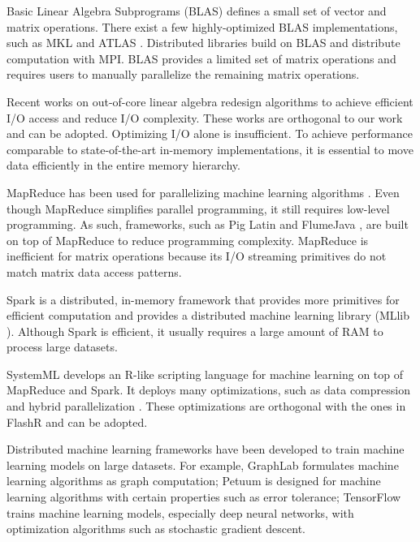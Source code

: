 Basic Linear Algebra Subprograms (BLAS) defines a small set of vector and
matrix operations. There exist a few highly-optimized BLAS implementations,
such as MKL \cite{mkl} and ATLAS \cite{atlas}. 
Distributed libraries \cite{trilinos, petsc, elemental}
build on BLAS and distribute computation with MPI.
BLAS provides a limited set of matrix operations and requires
users to manually parallelize the remaining matrix operations.

Recent works on out-of-core linear algebra \cite{Toledo99, Quintana-Orti12}
redesign algorithms to achieve efficient I/O access and reduce I/O
complexity. These works are orthogonal to our work and can be adopted.
Optimizing I/O
alone is insufficient. To achieve performance comparable to state-of-the-art
in-memory implementations, it is essential to move data efficiently in
the entire memory hierarchy.

MapReduce \cite{mapreduce} has been used for parallelizing machine learning
algorithms \cite{Chu06}. Even though MapReduce simplifies parallel programming,
it still requires low-level programming. As such, frameworks, such as Pig Latin
\cite{pig} and FlumeJava \cite{flumejava}, are built on top
of MapReduce to reduce programming complexity. MapReduce is inefficient for
matrix operations because
its I/O streaming primitives do not match matrix data access patterns.

Spark \cite{spark} is a distributed, in-memory framework that provides more
primitives for efficient computation and provides a distributed machine
learning library (MLlib \cite{mllib}). Although Spark is efficient, it usually
requires a large amount of RAM to process large datasets.

SystemML \cite{systemml, systemml2} develops an R-like scripting language for
machine learning on top of MapReduce and Spark. It deploys many optimizations,
such as data compression \cite{Elgohary16} and hybrid parallelization
\cite{Boehm14}. These optimizations are orthogonal with the ones in FlashR
and can be adopted.

Distributed machine learning frameworks have been developed to train machine
learning models on large datasets. For example, GraphLab \cite{graphlab}
formulates machine learning algorithms as graph computation; Petuum \cite{petuum}
is designed for machine learning algorithms with certain properties such as
error tolerance; TensorFlow \cite{tensorflow} trains machine learning models,
especially deep neural networks, with optimization algorithms such as
stochastic gradient descent.

